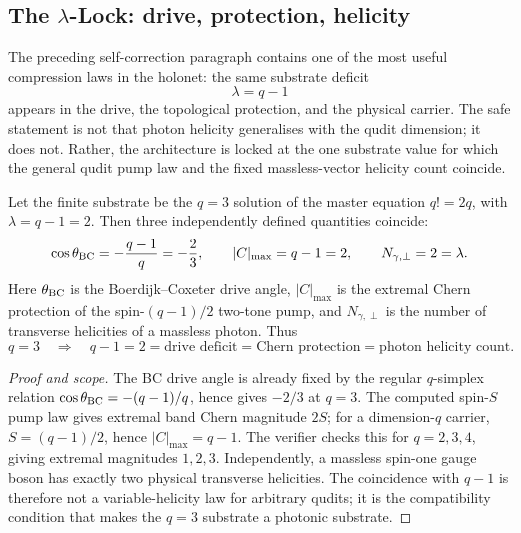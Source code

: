 
\subsection{The \texorpdfstring{$\lambda$}{lambda}-Lock: drive, protection, helicity}
\label{sec:bt1201-lambda-lock}

The preceding self-correction paragraph contains one of the most useful
compression laws in the holonet: the same substrate deficit
\[
  \lambda=q-1
\]
appears in the drive, the topological protection, and the physical carrier.  The
safe statement is not that photon helicity generalises with the qudit dimension;
it does not.  Rather, the architecture is locked at the one substrate value for
which the general qudit pump law and the fixed massless-vector helicity count
coincide.

\begin{theorem}
\label{thm:bt1201-lambda-lock}
Let the finite substrate be the $q=3$ solution of the master equation
$q!=2q$, with $\lambda=q-1=2$.  Then three independently defined quantities
coincide:
\[
  \cos\theta_{\rm BC}=-\frac{q-1}{q}=-\frac23,
  \qquad
  |C|_{\max}=q-1=2,
  \qquad
  N_{\gamma,\perp}=2=\lambda.
\]
Here $\theta_{\rm BC}$ is the Boerdijk--Coxeter drive angle, $|C|_{\max}$ is the
extremal Chern protection of the spin-$(q-1)/2$ two-tone pump, and
$N_{\gamma,\perp}$ is the number of transverse helicities of a massless photon.
Thus
\[
  \boxed{
  q=3
  \quad\Longrightarrow\quad
  q-1=2
  =\text{drive deficit}
  =\text{Chern protection}
  =\text{photon helicity count}.
  }
\]
\end{theorem}

\begin{proof}[Proof and scope]
The BC drive angle is already fixed by the regular $q$-simplex relation
$\cos\theta_{\rm BC}=-(q-1)/q$, hence gives $-2/3$ at $q=3$.  The computed
spin-$S$ pump law gives extremal band Chern magnitude $2S$; for a dimension-$q$
carrier, $S=(q-1)/2$, hence $|C|_{\max}=q-1$.  The verifier checks this for
$q=2,3,4$, giving extremal magnitudes $1,2,3$.  Independently, a massless
spin-one gauge boson has exactly two physical transverse helicities.  The
coincidence with $q-1$ is therefore not a variable-helicity law for arbitrary
qudits; it is the compatibility condition that makes the $q=3$ substrate a
photonic substrate.
\end{proof}

